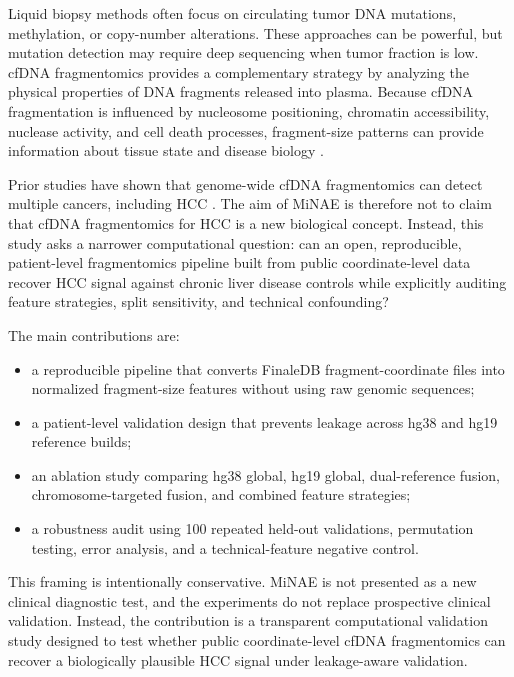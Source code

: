 \documentclass[conference]{IEEEtran}
\begin{document}
Liquid biopsy methods often focus on circulating tumor DNA mutations, methylation, or copy-number alterations. These approaches can be powerful, but mutation detection may require deep sequencing when tumor fraction is low. cfDNA fragmentomics provides a complementary strategy by analyzing the physical properties of DNA fragments released into plasma. Because cfDNA fragmentation is influenced by nucleosome positioning, chromatin accessibility, nuclease activity, and cell death processes, fragment-size patterns can provide information about tissue state and disease biology \cite{snyder2016cellfree,mouliere2011fragmentation,cristiano2019genomewide}.

Prior studies have shown that genome-wide cfDNA fragmentomics can detect multiple cancers, including HCC \cite{cristiano2019genomewide,foda2023detecting}. The aim of MiNAE is therefore not to claim that cfDNA fragmentomics for HCC is a new biological concept. Instead, this study asks a narrower computational question: can an open, reproducible, patient-level fragmentomics pipeline built from public coordinate-level data recover HCC signal against chronic liver disease controls while explicitly auditing feature strategies, split sensitivity, and technical confounding?

The main contributions are:
\begin{itemize}
    \item a reproducible pipeline that converts FinaleDB fragment-coordinate files into normalized fragment-size features without using raw genomic sequences;
    \item a patient-level validation design that prevents leakage across hg38 and hg19 reference builds;
    \item an ablation study comparing hg38 global, hg19 global, dual-reference fusion, chromosome-targeted fusion, and combined feature strategies;
    \item a robustness audit using 100 repeated held-out validations, permutation testing, error analysis, and a technical-feature negative control.
\end{itemize}

This framing is intentionally conservative. MiNAE is not presented as a new clinical diagnostic test, and the experiments do not replace prospective clinical validation. Instead, the contribution is a transparent computational validation study designed to test whether public coordinate-level cfDNA fragmentomics can recover a biologically plausible HCC signal under leakage-aware validation.
\end{document}
